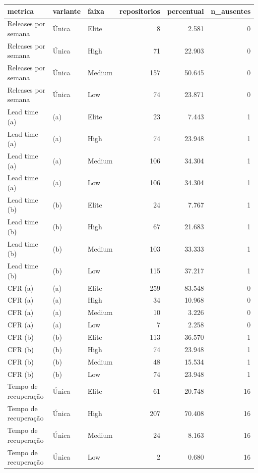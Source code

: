 \begin{tabular}{lllrrr}
\toprule
metrica & variante & faixa & repositorios & percentual & n_ausentes \\
\midrule
Releases por semana & Única & Elite & 8 & 2.581 & 0 \\
Releases por semana & Única & High & 71 & 22.903 & 0 \\
Releases por semana & Única & Medium & 157 & 50.645 & 0 \\
Releases por semana & Única & Low & 74 & 23.871 & 0 \\
Lead time (a) & (a) & Elite & 23 & 7.443 & 1 \\
Lead time (a) & (a) & High & 74 & 23.948 & 1 \\
Lead time (a) & (a) & Medium & 106 & 34.304 & 1 \\
Lead time (a) & (a) & Low & 106 & 34.304 & 1 \\
Lead time (b) & (b) & Elite & 24 & 7.767 & 1 \\
Lead time (b) & (b) & High & 67 & 21.683 & 1 \\
Lead time (b) & (b) & Medium & 103 & 33.333 & 1 \\
Lead time (b) & (b) & Low & 115 & 37.217 & 1 \\
CFR (a) & (a) & Elite & 259 & 83.548 & 0 \\
CFR (a) & (a) & High & 34 & 10.968 & 0 \\
CFR (a) & (a) & Medium & 10 & 3.226 & 0 \\
CFR (a) & (a) & Low & 7 & 2.258 & 0 \\
CFR (b) & (b) & Elite & 113 & 36.570 & 1 \\
CFR (b) & (b) & High & 74 & 23.948 & 1 \\
CFR (b) & (b) & Medium & 48 & 15.534 & 1 \\
CFR (b) & (b) & Low & 74 & 23.948 & 1 \\
Tempo de recuperação & Única & Elite & 61 & 20.748 & 16 \\
Tempo de recuperação & Única & High & 207 & 70.408 & 16 \\
Tempo de recuperação & Única & Medium & 24 & 8.163 & 16 \\
Tempo de recuperação & Única & Low & 2 & 0.680 & 16 \\
\bottomrule
\end{tabular}
